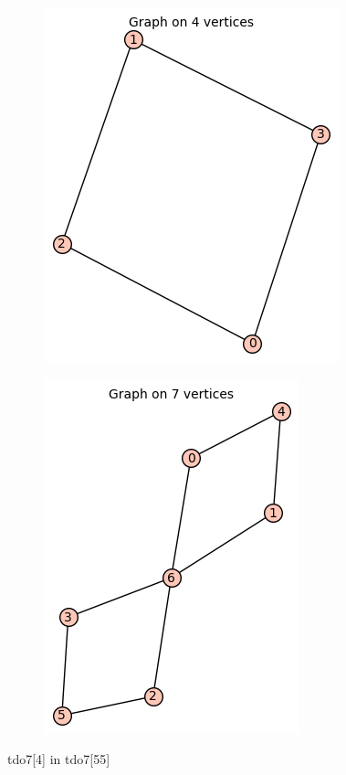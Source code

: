 \documentclass[12pt, a4paper]{article}
\begin{document}
\begin{center}
\begin{figure}[!htb]
\centering
\begin{subfigure}{0.5\textwidth}
  \centering
  \includegraphics[width=0.35\linewidth]{tdo7[4]}
\end{subfigure}%
\begin{subfigure}{0.5\textwidth}
  \centering
  \includegraphics[width=0.35\linewidth]{tdo7[55]}
\end{subfigure}
\caption{tdo7[4] in tdo7[55]}
\label{fig:test}
\end{figure}


\end{center}
\end{document}
